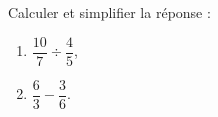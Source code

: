 
\begin{exercice}\label{exo2smath-0091}

    Calculer et simplifier la réponse :
    \begin{multicols}{2}
        \begin{enumerate}
            \item
                \( \dfrac{ 10 }{ 7 }\div \dfrac{ 4 }{ 5 }\),
            \item
                \( \dfrac{ 6 }{ 3 }-\dfrac{ 3 }{ 6 }\).
        \end{enumerate}
    \end{multicols}

\end{exercice}

